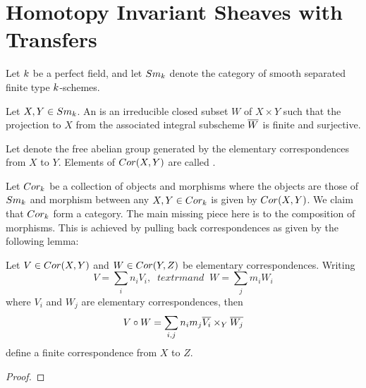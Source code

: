 \newpage
\section{Homotopy Invariant Sheaves with Transfers}\label{sect_hist}

Let $k$ be a perfect field, and let $Sm_{k}$ denote the 
category of smooth separated finite type $k$-schemes.

\begin{defn}\label{def_cor}
Let $X, Y \in Sm_{k}$. An  is an irreducible closed subset $W$ of $X \times Y$ such that 
the projection to $X$ from the associated integral subscheme 
$\overline{W}$ is finite and surjective.

Let  denote the free abelian group generated by 
the elementary correspondences from $X$ to $Y$. Elements of 
$Cor(X, Y)$ are called .
\end{defn}

Let $Cor_{k}$ be a collection of objects and morphisms 
where the objects are those of $Sm_{k}$ and morphism between any 
$X, Y \in Cor_{k}$ is given by $Cor(X, Y)$. We claim
that $Cor_{k}$ form a category. The main missing piece 
here is to the composition of morphisms. This is achieved by 
pulling back correspondences as given by the following lemma:

%
%
\begin{lem}\label{lem_cor_composition}
Let $V \in Cor(X, Y)$ and $W \in Cor(Y, Z)$ be elementary 
correspondences. Writing
\[
V = \sum_i n_i V_i, \;\;textrm{and}\;\; W = \sum_j m_i W_i
\]
where $V_i$ and $W_j$ are elementary correspondences, then
\[
V \circ W = \sum_{i, j} n_im_j \overline{V_i} \times_Y \overline{W_j}
\]
define a finite correspondence from $X$ to $Z$.
\end{lem}

\begin{proof}
\end{proof}

